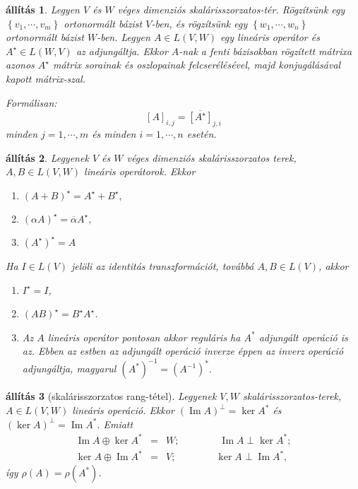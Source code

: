 \documentclass[9pt, a4paper, showtrims]{memoir}
\theoremstyle{plain}
\newtheorem{proposition}{állítás}[chapter]
\theoremstyle{remark}
\theoremstyle{definition}
\DeclareMathOperator{\im}{Im}
\begin{document}
\begin{proposition}
    Legyen $V$ és $W$ véges dimenziós skalárisszorzatos-tér.
    Rögzítsünk egy $\left\{ v_1,\cdots,v_m \right\}$ ortonormált bázist $V$-ben,
    és rögzítsünk egy $\left\{w_1,\cdots,w_n\right\}$ ortonormált bázist $W$-ben.
    Legyen $A\in L\left( V,W \right)$ egy lineáris operátor és $A^\star\in L\left( W,V \right)$ az adjungáltja.
    Ekkor $A$-nak a fenti bázisokban rögzített mátrixa azonos 
    $A^\star$ mátrix sorainak és oszlopainak felcserélésével, majd konjugálásával kapott mátrix-szal.

    Formálisan:
    \[
        \left[ A \right]_{i,j}=\overline{\left[ A^\star \right]}_{j,i}
    \]
    minden $j=1,\cdots,m$ és minden $i=1,\cdots,n$ esetén.
\end{proposition}

\begin{proposition}
    Legyenek $V$ és $W$ véges dimenziós skalárisszorzatos terek, $A,B\in L\left( V,W \right)$ lineáris operátorok.
    Ekkor
    \begin{enumerate}
        \item $\left( A+B \right)^\star=A^\star+B^\star,$
        \item $\left( \alpha A \right)^\star=\overline\alpha A^\star,$
        \item $(A^\star)^\star=A$
    \end{enumerate}
    Ha $I\in L\left( V \right)$ jelöli az identitás transzformációt, továbbá $A,B\in L\left( V \right)$, akkor
    \begin{enumerate}
        \item $I^\star=I$,
        \item $\left( AB \right)^\star=B^\star A^\star$.
        \item Az $A$ lineáris operátor pontosan akkor reguláris ha $A^\ast$ adjungált operáció is az.
            Ebben az estben az adjungált operáció inverze éppen az inverz operáció adjungáltja, magyarul
            \begin{math}
                \left( A^\ast \right)^{-1}=\left( A^{-1} \right)^\ast.
            \end{math}
            \qedhere
    \end{enumerate}
\end{proposition}

\begin{proposition}[skalárisszorzatos rang-tétel]
    Legyenek $V,W$ skalárisszorzatos-terek, $A\in L\left( V,W \right)$ lineáris operáció.
    Ekkor 
         $(\im A)^\perp=\ker A^\ast$ és
         $(\ker A)^\perp=\im A^\ast.$
    Emiatt 
    \begin{eqnarray*}
        \im A\oplus\ker A^\ast&=& W;\qquad\qquad\im A\perp\ker A^\ast;\\
        \ker A\oplus\im A^\ast&=& V;\qquad\qquad\ker A\perp\im A^\ast,
    \end{eqnarray*}
    így $\rho\left( A \right)=\rho\left( A^\ast \right)$.
\end{proposition}
\end{document}
